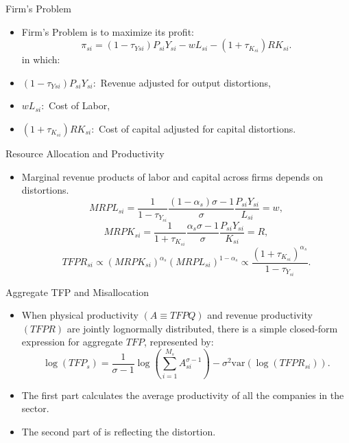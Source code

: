\documentclass[10pt]{beamer}
\begin{document}
\begin{frame}{Firm's Problem}
    \begin{itemize} 
    \item Firm's Problem is to maximize its profit: 
        \begin{equation}
            \pi_{si} = (1 - \tau_{Ysi})P_{si}Y_{si} - wL_{si} - (1 + \tau_{K_{si}})RK_{si}.
        \end{equation}
    in which:
    \item $(1 - \tau_{Ysi})P_{si}Y_{si}:$ Revenue adjusted for output distortions,    
    \item $wL_{si}:$ Cost of Labor,
    \item $(1 + \tau_{K_{si}})RK_{si}:$ Cost of capital adjusted for capital distortions.
\end{itemize} 
\end{frame}

\begin{frame}{Resource Allocation and Productivity}
    \begin{itemize}
        \item Marginal revenue products of labor and capital across firms depends on distortions.
     \begin{equation}
        MRPL_{si} = \frac{1}{1 - \tau_{Y_{si}}} \frac{(1 - \alpha_s) \sigma - 1}{\sigma} \frac{P_{si}Y_{si}}{L_{si}} = w,
    \end{equation}
    \begin{equation}
        MRPK_{si} = \frac{1}{1 + \tau_{K_{si}}} \frac{\alpha_s \sigma - 1}{\sigma} \frac{P_{si}Y_{si}}{K_{si}} = R,
        \end{equation}
    \begin{equation}
        TFPR_{si}\propto (MRPK_{si})^{\alpha_s} (MRPL_{si})^{1-\alpha_s} \propto \dfrac{(1 + \tau_{K_{si}})^{\alpha_s}}{1 - \tau_{Y_{si}}}.
    \end{equation}
    \end{itemize}
\end{frame}

\begin{frame}{Aggregate TFP and Misallocation}
    \begin{itemize}
        \item When physical productivity $(A\equiv TFPQ)$ and revenue productivity $(TFPR)$ are jointly lognormally distributed,
        there is a simple closed-form expression for aggregate $TFP$, represented by:
        \begin{equation}
            \log(TFP_s) = \frac{1}{\sigma - 1} \log \left(\sum_{i=1}^{M_s} A_{si}^{\sigma-1}\right) - \sigma^2 \text{var} (\log(TFPR_{si})).
        \end{equation}
        \item The first part calculates the average productivity of all the companies in the sector.
        \item The second part of is reflecting the distortion.
    \end{itemize}
\end{frame}
\end{document}

